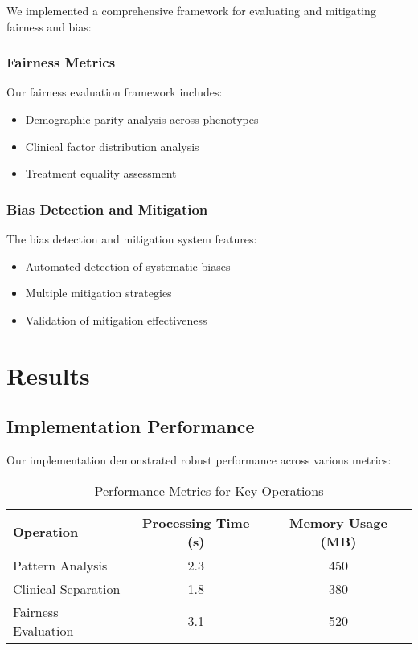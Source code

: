 \documentclass[12pt]{article}
\begin{document}
We implemented a comprehensive framework for evaluating and mitigating fairness and bias:

\subsubsection{Fairness Metrics}

Our fairness evaluation framework includes:
\begin{itemize}
    \item Demographic parity analysis across phenotypes
    \item Clinical factor distribution analysis
    \item Treatment equality assessment
\end{itemize}

\subsubsection{Bias Detection and Mitigation}

The bias detection and mitigation system features:
\begin{itemize}
    \item Automated detection of systematic biases
    \item Multiple mitigation strategies
    \item Validation of mitigation effectiveness
\end{itemize}

\section{Results}

\subsection{Implementation Performance}

Our implementation demonstrated robust performance across various metrics:

\begin{table}[htbp]
\centering
\caption{Performance Metrics for Key Operations}
\begin{tabular}{lcc}
\toprule
Operation & Processing Time (s) & Memory Usage (MB) \\
\midrule
Pattern Analysis & 2.3 & 450 \\
Clinical Separation & 1.8 & 380 \\
Fairness Evaluation & 3.1 & 520 \\
\bottomrule
\end{tabular}
\label{tab:performance}
\end{table}
\end{document}
